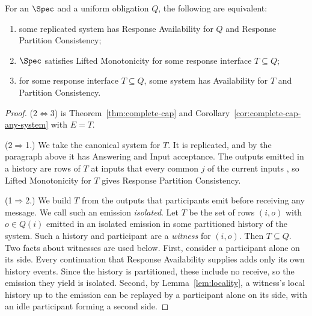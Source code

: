\begin{theorem}
\label{thm:complete-cap-response}
For an \spectype $\Spec$ and a uniform obligation $Q$,
the following are equivalent:
\begin{enumerate}
  \item some replicated system has Response Availability for $Q$ and
        Response Partition Consistency;
  \item $\Spec$ satisfies Lifted Monotonicity for some response interface $T\subseteq Q$;
  \item for some response interface $T\subseteq Q$, some system has
        Availability for $T$ and Partition Consistency.
\end{enumerate}
\end{theorem}

\begin{proof}
(2$\Leftrightarrow$3) is Theorem~\ref{thm:complete-cap} and
Corollary~\ref{cor:complete-cap-any-system} with $E=T$.

(2$\Rightarrow$1.)  We take the canonical system for $T$.  It is replicated, and by the
paragraph above it has Answering and Input acceptance.  The outputs emitted in
a history are rows of $T$ at inputs that every common \indesc $j$ of the
current inputs \inrel, so Lifted Monotonicity for $T$ gives Response Partition
Consistency.

(1$\Rightarrow$2.)  We build $T$ from the outputs that participants emit
before receiving any message.  We call such an emission \emph{isolated}.  Let
$T$ be the set of
rows $(i,o)$ with $o\in Q(i)$ emitted in an isolated emission in some
partitioned history of the system.  Such a history and participant are a
\emph{witness} for $(i,o)$.  Then $T\subseteq Q$.  Two facts about witnesses
are used below.  First, consider a participant alone on its side.  Every
continuation that Response Availability supplies adds only its own history
events.  Since the history is partitioned, these include no receive, so the
emission they yield is isolated.  Second, by Lemma~\ref{lem:locality}, a
witness's local history up to the emission can be replayed by a participant
alone on its side, with an idle participant forming a second side.


\end{proof}
